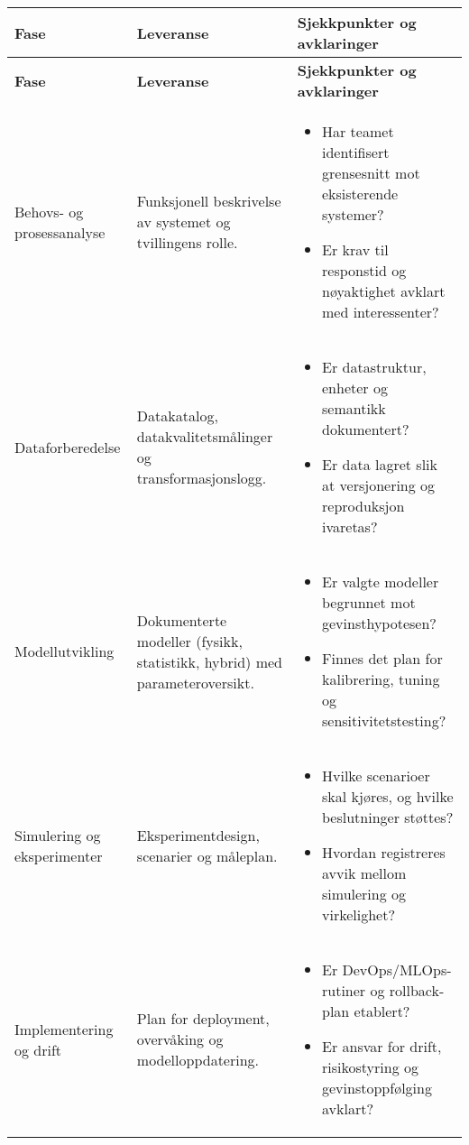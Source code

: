 \begin{longtable}{p{}p{}p{}}
\toprule
\textbf{Fase} & \textbf{Leveranse} & \textbf{Sjekkpunkter og avklaringer} \\
\midrule
\endfirsthead
\toprule
\textbf{Fase} & \textbf{Leveranse} & \textbf{Sjekkpunkter og avklaringer} \\
\midrule
\endhead
Behovs- og prosessanalyse & Funksjonell beskrivelse av systemet og tvillingens rolle. & \begin{itemize}[leftmargin=*]
    \item Har teamet identifisert grensesnitt mot eksisterende systemer?
    \item Er krav til responstid og nøyaktighet avklart med interessenter?
\end{itemize}\\
Dataforberedelse & Datakatalog, datakvalitetsmålinger og transformasjonslogg. & \begin{itemize}[leftmargin=*]
    \item Er datastruktur, enheter og semantikk dokumentert?
    \item Er data lagret slik at versjonering og reproduksjon ivaretas?
\end{itemize}\\
Modellutvikling & Dokumenterte modeller (fysikk, statistikk, hybrid) med parameteroversikt. & \begin{itemize}[leftmargin=*]
    \item Er valgte modeller begrunnet mot gevinsthypotesen?
    \item Finnes det plan for kalibrering, tuning og sensitivitetstesting?
\end{itemize}\\
Simulering og eksperimenter & Eksperimentdesign, scenarier og måleplan. & \begin{itemize}[leftmargin=*]
    \item Hvilke scenarioer skal kjøres, og hvilke beslutninger støttes?
    \item Hvordan registreres avvik mellom simulering og virkelighet?
\end{itemize}\\
Implementering og drift & Plan for deployment, overvåking og modelloppdatering. & \begin{itemize}[leftmargin=*]
    \item Er DevOps/MLOps-rutiner og rollback-plan etablert?
    \item Er ansvar for drift, risikostyring og gevinstoppfølging avklart?
\end{itemize}\\
\bottomrule
\end{longtable}

